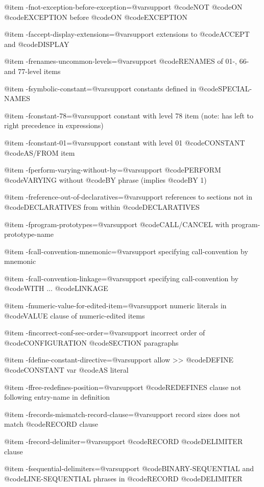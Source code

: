 @item -fnot-exception-before-exception=@var{support}
@code{NOT} @code{ON} @code{EXCEPTION} before @code{ON} @code{EXCEPTION}

@item -faccept-display-extensions=@var{support}
extensions to @code{ACCEPT} and @code{DISPLAY}

@item -frenames-uncommon-levels=@var{support}
@code{RENAMES} of 01-, 66- and 77-level items

@item -fsymbolic-constant=@var{support}
constants defined in @code{SPECIAL-NAMES}

@item -fconstant-78=@var{support}
constant with level 78 item (note: has left to right precedence in expressions)

@item -fconstant-01=@var{support}
constant with level 01 @code{CONSTANT} @code{AS/FROM} item

@item -fperform-varying-without-by=@var{support}
@code{PERFORM} @code{VARYING} without @code{BY} phrase (implies @code{BY 1})

@item -freference-out-of-declaratives=@var{support}
references to sections not in @code{DECLARATIVES} from within @code{DECLARATIVES}

@item -fprogram-prototypes=@var{support}
@code{CALL/CANCEL} with program-prototype-name

@item -fcall-convention-mnemonic=@var{support}
specifying call-convention by mnemonic

@item -fcall-convention-linkage=@var{support}
specifying call-convention by @code{WITH} ... @code{LINKAGE}

@item -fnumeric-value-for-edited-item=@var{support}
numeric literals in @code{VALUE} clause of numeric-edited items

@item -fincorrect-conf-sec-order=@var{support}
incorrect order of @code{CONFIGURATION} @code{SECTION} paragraphs

@item -fdefine-constant-directive=@var{support}
allow >> @code{DEFINE} @code{CONSTANT} var @code{AS} literal

@item -ffree-redefines-position=@var{support}
@code{REDEFINES} clause not following entry-name in definition

@item -frecords-mismatch-record-clause=@var{support}
record sizes does not match @code{RECORD} clause

@item -frecord-delimiter=@var{support}
@code{RECORD} @code{DELIMITER} clause

@item -fsequential-delimiters=@var{support}
@code{BINARY-SEQUENTIAL} and @code{LINE-SEQUENTIAL} phrases in @code{RECORD} @code{DELIMITER}


